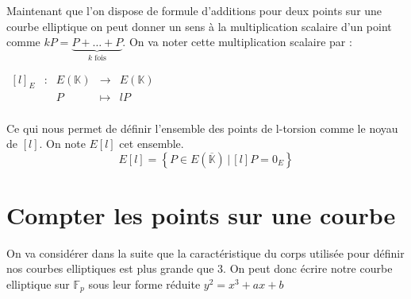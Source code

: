 \documentclass{article}
\begin{document}
Maintenant que l'on dispose de formule d'additions pour deux points sur une courbe elliptique on peut donner un sens à la multiplication scalaire d'un point comme $kP = \underbrace{P + \ldots + P}_{k \text{ fois}}$. On va noter cette multiplication scalaire par :
\newline

$\begin{array}{ccccc}
[l]_E & : & E(\mathbb{K}) & \to & E(\mathbb{K}) \\
 & & P & \mapsto & lP\\
\end{array}$

Ce qui nous permet de définir l'ensemble des points de l-torsion comme le noyau de $[l]$. On note $E[l]$ cet ensemble.
\newline
$$E[l] = \left\{ P \in E(\overline{\mathbb{K}}) \, | \, [l]P = 0_E \right\} $$

\section{Compter les points sur une courbe}
On va considérer dans la suite que la caractéristique du corps utilisée pour définir nos courbes elliptiques est plus grande que $3$. On peut donc écrire notre courbe elliptique sur $\mathbb{F}_p$ sous leur forme réduite $y^2 = x^3 + ax+b$
\end{document}
